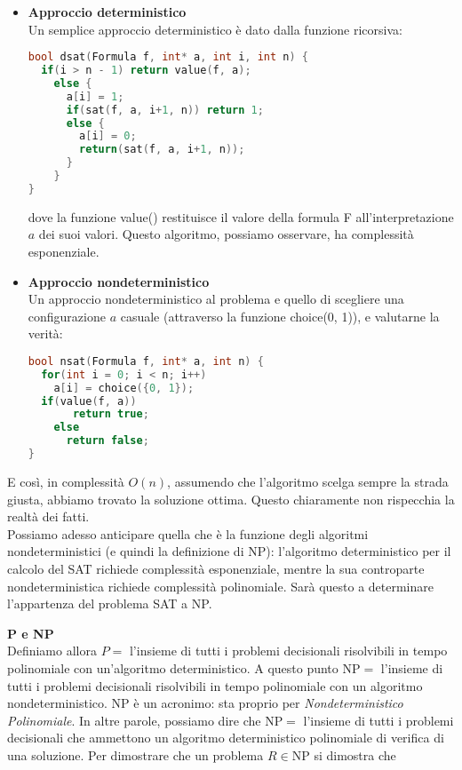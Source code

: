 \documentclass[a4paper,12pt]{article}
\begin{document}
\begin{itemize}
  \item \textbf{Approccio deterministico} \\
    Un semplice approccio deterministico è dato dalla funzione ricorsiva:
\begin{lstlisting}[language=C++]
bool dsat(Formula f, int* a, int i, int n) {
  if(i > n - 1) return value(f, a);
    else {
      a[i] = 1;
      if(sat(f, a, i+1, n)) return 1;
      else {
        a[i] = 0;
        return(sat(f, a, i+1, n));
      }
    }
}
\end{lstlisting}
dove la funzione value() restituisce il valore della formula F all'interpretazione $a$ dei suoi valori. Questo algoritmo, possiamo osservare, ha complessità esponenziale.
  \item \textbf{Approccio nondeterministico} \\
    Un approccio nondeterministico al problema e quello di scegliere una configurazione $a$ casuale (attraverso la funzione choice({0, 1})), e valutarne la
    verità:
\begin{lstlisting}[language=C++]
bool nsat(Formula f, int* a, int n) {
  for(int i = 0; i < n; i++) 
    a[i] = choice({0, 1});
  if(value(f, a))
       return true;
    else
      return false;
}
\end{lstlisting}
\end{itemize}
E così, in complessità $O(n)$, assumendo che l'algoritmo scelga sempre la strada giusta, abbiamo trovato la soluzione ottima. Questo chiaramente
non rispecchia la realtà dei fatti. \\
Possiamo adesso anticipare quella che è la funzione degli algoritmi nondeterministici (e quindi la definizione di NP): l'algoritmo deterministico per il calcolo del SAT
richiede complessità esponenziale, mentre la sua controparte nondeterministica richiede complessità polinomiale. Sarà questo a determinare l'appartenza del problema SAT a NP.
\par\smallskip
\textbf{P e NP} \\
Definiamo allora $P = $ l'insieme di tutti i problemi decisionali risolvibili in tempo polinomiale con un'algoritmo deterministico. A questo
punto $\mathrm{NP} = $ l'insieme di tutti i problemi decisionali risolvibili in tempo polinomiale con un algoritmo nondeterministico. NP è un acronimo:
sta proprio per \textit{Nondeterministico Polinomiale}. In altre parole, possiamo dire che $\mathrm{NP}=$ l'insieme di tutti i problemi decisionali
che ammettono un algoritmo deterministico polinomiale di verifica di una soluzione. Per dimostrare che un problema $R \in \mathrm{NP}$ si dimostra che
\end{document}
